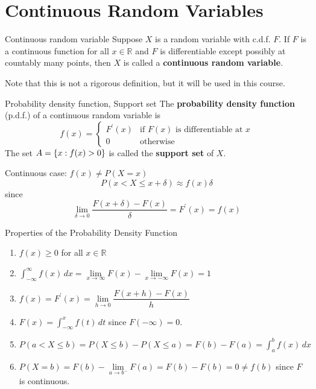\section{Continuous Random Variables}
\begin{Definition}{Continuous random variable}{}
    Suppose $ X $ is a random variable with c.d.f. $ F $. If $ F $
    is a continuous function for all $ x\in\mathbb{R} $ and
    $ F $ is differentiable except possibly at
    countably many points, then $ X $ is called a
    \textbf{continuous random variable}.
\end{Definition}
Note that this is not a rigorous definition, but it will be
used in this course.

\begin{Definition}{Probability density function, Support set}{}
    The \textbf{probability density function} (p.d.f.) of a continuous random variable
    is
    \[ f(x)=\begin{cases}
            F^\prime(x) & \text{if }F(x)\text{ is differentiable at }x \\
            0           & \text{otherwise}
        \end{cases} \]
    The set $ A=\{x:f(x)>0\} $ is called the \textbf{support set}
    of $ X $.
\end{Definition}

Continuous case: $ f(x)\neq P(X=x) $
\[ P(x<X\leqslant x+\delta)\approx f(x)\delta \]
since
\[ \lim\limits_{{\delta} \to {0}}\frac{F(x+\delta)-F(x)}{\delta}=F^\prime(x)=f(x) \]
\begin{Proposition}{Properties of the Probability Density Function}{}
    \begin{enumerate}[label=(\arabic*)]
        \item $ f(x)\geqslant 0 $ for all $ x\in\mathbb{R} $
        \item $ \displaystyle \int_{-\infty}^{\infty} f(x)\, d{x} =
                  \lim\limits_{{x} \to {\infty}} F(x)-
                  \lim\limits_{{x} \to {-\infty}} F(x)= 1 $
        \item $ f(x)=F^\prime(x)=
                  \lim\limits_{{h} \to {0}} \dfrac{F(x+h)-F(x)}{h} $
        \item $ F(x)=\displaystyle \int_{-\infty}^{x} f(t)\, d{t} $
              since $ F(-\infty)=0 $.
        \item $ P(a< X\leqslant b)=P(X\leqslant b)-
                  P(X\leqslant a)=F(b)-F(a)
                  =\displaystyle \int_{a}^{b} f(x)\, d{x}  $
        \item $ P(X=b)=F(b)-\lim\limits_{{a} \to {b^-}}
                  F(a)=F(b)-F(b) =0\neq f(b) $ since $ F $ is continuous.
    \end{enumerate}
\end{Proposition}

